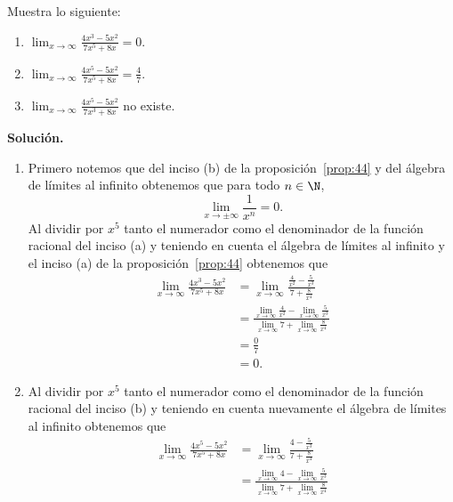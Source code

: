 \documentclass[12pt,a4paper]{book}
\begin{document}
    \begin{ejemplo}\label{ejm:56}
        Muestra lo siguiente:
        \begin{enumerate}[nosep]
            \item $\lim_{x\to\infty}\frac{4x^{3}-5x^{2}}{7x^{5}+8x}=0$.
            \item $\lim_{x\to\infty}\frac{4x^{5}-5x^{2}}{7x^{5}+8x}=\frac{4}{7}$.
            \item $\lim_{x\to\infty}\frac{4x^{5}-5x^{2}}{7x^{3}+8x}$ no existe.
        \end{enumerate}

        \textbf{Solución.}
        \begin{enumerate}
            \item Primero notemos que del inciso (b) de la proposición~\ref{prop:44} y del álgebra de
            límites al infinito obtenemos que para todo $n\in\N$,
            \begin{equation*}
                \lim_{x\to\pm\infty}\frac{1}{x^{n}}=0.
            \end{equation*}
            Al dividir por $x^{5}$ tanto el numerador como el denominador de la función
            racional del inciso (a) y teniendo en cuenta el álgebra de límites al infinito
            y el inciso (a) de la proposición~\ref{prop:44} obtenemos que
            \begin{align*}
                \lim_{x\to\infty}\frac{4x^{3}-5x^{2}}{7x^{5}+8x}&=\lim_{x\to\infty}\frac{\frac{4}{x^{2}}-\frac{5}{x^{3}}}{7+\frac{8}{x^{4}}}\\
                &=\frac{\lim_{x\to\infty}\frac{4}{x^{2}}-\lim_{x\to\infty}\frac{5}{x^{3}}}{\lim_{x\to\infty}7+\lim_{x\to\infty}\frac{8}{x^{4}}}\\
                &=\frac{0}{7}\\
                &=0.
            \end{align*}
            \item Al dividir por $x^{5}$ tanto el numerador como el denominador de la función
            racional del inciso (b) y teniendo en cuenta nuevamente el álgebra de
            límites al infinito obtenemos que
            \begin{align*}
                \lim_{x\to\infty}\frac{4x^{5}-5x^{2}}{7x^{5}+8x}&=\lim_{x\to\infty}\frac{4-\frac{5}{x^{3}}}{7+\frac{8}{x^{4}}}\\
                &=\frac{\lim_{x\to\infty}4-\lim_{x\to\infty}\frac{5}{x^{3}}}{\lim_{x\to\infty}7+\lim_{x\to\infty}\frac{8}{x^{4}}}\\

\end{align*}
\end{enumerate}
\end{ejemplo}
\end{document}
